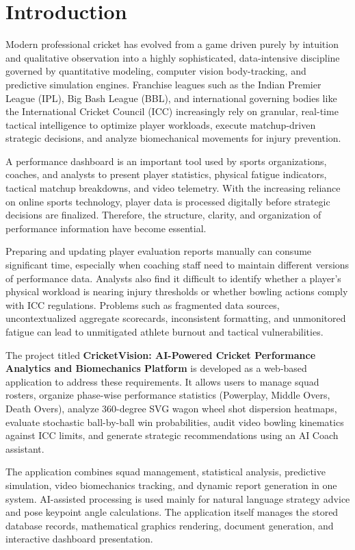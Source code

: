 \chapter{Introduction}

Modern professional cricket has evolved from a game driven purely by intuition and qualitative observation into a highly sophisticated, data-intensive discipline governed by quantitative modeling, computer vision body-tracking, and predictive simulation engines. Franchise leagues such as the Indian Premier League (IPL), Big Bash League (BBL), and international governing bodies like the International Cricket Council (ICC) increasingly rely on granular, real-time tactical intelligence to optimize player workloads, execute matchup-driven strategic decisions, and analyze biomechanical movements for injury prevention.

A performance dashboard is an important tool used by sports organizations, coaches, and analysts to present player statistics, physical fatigue indicators, tactical matchup breakdowns, and video telemetry. With the increasing reliance on online sports technology, player data is processed digitally before strategic decisions are finalized. Therefore, the structure, clarity, and organization of performance information have become essential.

Preparing and updating player evaluation reports manually can consume significant time, especially when coaching staff need to maintain different versions of performance data. Analysts also find it difficult to identify whether a player's physical workload is nearing injury thresholds or whether bowling actions comply with ICC regulations. Problems such as fragmented data sources, uncontextualized aggregate scorecards, inconsistent formatting, and unmonitored fatigue can lead to unmitigated athlete burnout and tactical vulnerabilities.

The project titled \textbf{CricketVision: AI-Powered Cricket Performance Analytics and Biomechanics Platform} is developed as a web-based application to address these requirements. It allows users to manage squad rosters, organize phase-wise performance statistics (Powerplay, Middle Overs, Death Overs), analyze 360-degree SVG wagon wheel shot dispersion heatmaps, evaluate stochastic ball-by-ball win probabilities, audit video bowling kinematics against ICC limits, and generate strategic recommendations using an AI Coach assistant.

The application combines squad management, statistical analysis, predictive simulation, video biomechanics tracking, and dynamic report generation in one system. AI-assisted processing is used mainly for natural language strategy advice and pose keypoint angle calculations. The application itself manages the stored database records, mathematical graphics rendering, document generation, and interactive dashboard presentation.

